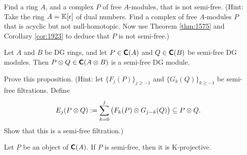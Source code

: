 \begin{exer} \label{exa:1577}
Find a ring $A$, and a complex $P$ of free $A$-modules, that is not semi-free. 
(Hint: Take the ring $A = \mathbb{K}[\epsilon]$ of dual numbers. Find a complex of free 
$A$-modules $P$ that is acyclic but not null-homotopic. Now use Theorem 
\ref{thm:1575} and Corollary \ref{cor:1923}  to deduce that $P$ is not 
semi-free.)
\end{exer}

\begin{prop} \label{prop:4636}
Let $A$ and $B$ be DG rings, and let $P \in \boldsymbol{\mathsf{C}}(A)$ and 
$Q \in \boldsymbol{\mathsf{C}}(B)$ be semi-free DG modules. Then 
$P \otimes Q \in \boldsymbol{\mathsf{C}}(A \otimes B)$
is a semi-free DG module.
\end{prop}

\begin{exer} \label{exer:4636}
Prove this proposition. (Hint: let $\bigl\{ F_j(P) \bigr\}_{j \geq -1}$
and \lb $\bigl\{ G_k(Q) \bigr\}_{k \geq -1}$ be semi-free filtrations. 
Define 
\[ E_{j}(P \otimes Q) := \sum_{k = 0}^{j} \, 
\bigl( F_k(P) \otimes G_{j - k}(Q) \bigr) \subseteq P \otimes Q . \]
Show that this is a semi-free filtration.) 
\end{exer}

\begin{thm} \label{thm:1575}
Let $P$ be an object of $\boldsymbol{\mathsf{C}}(A)$. If $P$ is semi-free, then it is 
K-projective. 
\end{thm}

